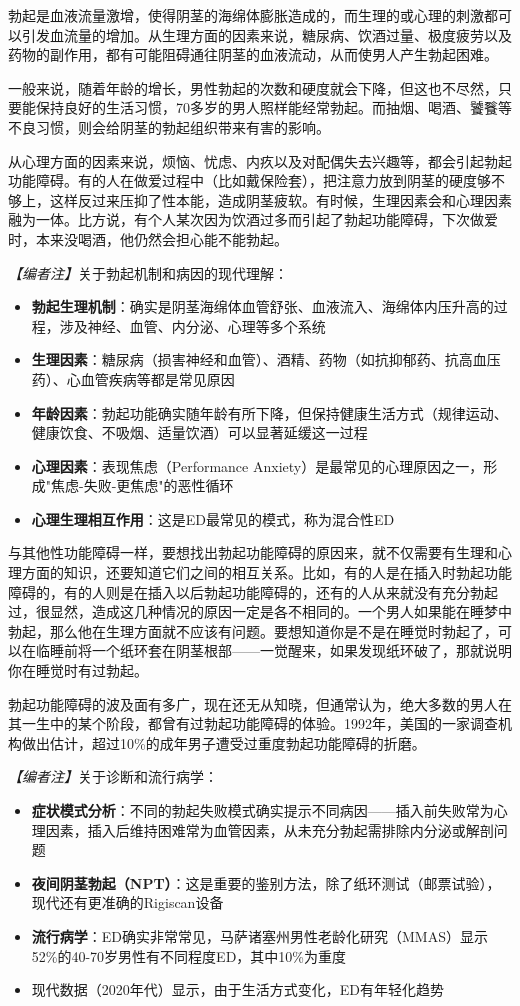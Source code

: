 勃起是血液流量激增，使得阴茎的海绵体膨胀造成的，而生理的或心理的刺激都可以引发血流量的增加。从生理方面的因素来说，糖尿病、饮酒过量、极度疲劳以及药物的副作用，都有可能阻碍通往阴茎的血液流动，从而使男人产生勃起困难。

一般来说，随着年龄的增长，男性勃起的次数和硬度就会下降，但这也不尽然，只要能保持良好的生活习惯，70多岁的男人照样能经常勃起。而抽烟、喝酒、饕餮等不良习惯，则会给阴茎的勃起组织带来有害的影响。

从心理方面的因素来说，烦恼、忧虑、内疚以及对配偶失去兴趣等，都会引起勃起功能障碍。有的人在做爱过程中（比如戴保险套），把注意力放到阴茎的硬度够不够上，这样反过来压抑了性本能，造成阴茎疲软。有时候，生理因素会和心理因素融为一体。比方说，有个人某次因为饮酒过多而引起了勃起功能障碍，下次做爱时，本来没喝酒，他仍然会担心能不能勃起。

\noindent\textit{【编者注】}关于勃起机制和病因的现代理解：
\begin{itemize}
	\item \textbf{勃起生理机制}：确实是阴茎海绵体血管舒张、血液流入、海绵体内压升高的过程，涉及神经、血管、内分泌、心理等多个系统
	\item \textbf{生理因素}：糖尿病（损害神经和血管）、酒精、药物（如抗抑郁药、抗高血压药）、心血管疾病等都是常见原因
	\item \textbf{年龄因素}：勃起功能确实随年龄有所下降，但保持健康生活方式（规律运动、健康饮食、不吸烟、适量饮酒）可以显著延缓这一过程
	\item \textbf{心理因素}：表现焦虑（Performance Anxiety）是最常见的心理原因之一，形成"焦虑-失败-更焦虑"的恶性循环
	\item \textbf{心理生理相互作用}：这是ED最常见的模式，称为混合性ED
\end{itemize}

与其他性功能障碍一样，要想找出勃起功能障碍的原因来，就不仅需要有生理和心理方面的知识，还要知道它们之间的相互关系。比如，有的人是在插入时勃起功能障碍的，有的人则是在插入以后勃起功能障碍的，还有的人从来就没有充分勃起过，很显然，造成这几种情况的原因一定是各不相同的。一个男人如果能在睡梦中勃起，那么他在生理方面就不应该有问题。要想知道你是不是在睡觉时勃起了，可以在临睡前将一个纸环套在阴茎根部——一觉醒来，如果发现纸环破了，那就说明你在睡觉时有过勃起。

勃起功能障碍的波及面有多广，现在还无从知晓，但通常认为，绝大多数的男人在其一生中的某个阶段，都曾有过勃起功能障碍的体验。1992年，美国的一家调查机构做出估计，超过10\%的成年男子遭受过重度勃起功能障碍的折磨。

\noindent\textit{【编者注】}关于诊断和流行病学：
\begin{itemize}
	\item \textbf{症状模式分析}：不同的勃起失败模式确实提示不同病因——插入前失败常为心理因素，插入后维持困难常为血管因素，从未充分勃起需排除内分泌或解剖问题
	\item \textbf{夜间阴茎勃起（NPT）}：这是重要的鉴别方法，除了纸环测试（邮票试验），现代还有更准确的Rigiscan设备
	\item \textbf{流行病学}：ED确实非常常见，马萨诸塞州男性老龄化研究（MMAS）显示52\%的40-70岁男性有不同程度ED，其中10\%为重度
	\item 现代数据（2020年代）显示，由于生活方式变化，ED有年轻化趋势
\end{itemize}

